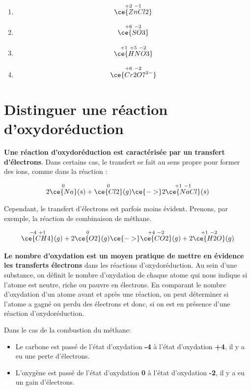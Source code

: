 \documentclass[
  11pt,
  french,
  a4paper,
  openany]{book}
\providecommand{\tightlist}{%
  \setlength{\itemsep}{0pt}\setlength{\parskip}{0pt}}
\begin{document}
\begin{Answer}

\begin{enumerate}
\def\labelenumi{\alph{enumi}.}
\tightlist
\item
  \[
  \overset{+2\ -1}{\ce{ZnCl2}}
  \]
\item
  \[
  \overset{+6\ -2}{\ce{SO3}}
  \]
\item
  \[
  \overset{+1\ +5\ -2}{\ce{HNO3}}
  \]
\item
  \[
  \overset{+6\ -2}{\ce{Cr2O7^{2-}}}
  \]
\end{enumerate}


\end{Answer}

\clearpage

\hypertarget{distinguer-une-ruxe9action-doxydoruxe9duction}{%
\section{Distinguer une réaction d'oxydoréduction}\label{distinguer-une-ruxe9action-doxydoruxe9duction}}

\textbf{Une réaction d'oxydoréduction est caractérisée par un transfert d'électrons}. Dans certains cas, le transfert se fait au sens propre pour former des ions, comme dans la réaction :

\[
2\overset{0}{\ce{Na}}(s) + \overset{0}{\ce{Cl2}}(g) \ce{->} 2\overset{+1\ -1}{\ce{NaCl}}(s)
\]

Cependant, le transfert d'électrons est parfois moins évident. Prenons, par exemple, la réaction de combinaison de méthane.

\[
\overset{-4\ +1}{\ce{CH4}}(g) + 2\overset{0}{\ce{O2}}(g) \ce{->} \overset{+4\ -2}{\ce{CO2}}(g) + 2\overset{+1\ -2}{\ce{H2O}}(g)
\]

\textbf{Le nombre d'oxydation est un moyen pratique de mettre en évidence les transferts électrons} dans les réactions d'oxydoréduction. Au sein d'une substance, on définit le nombre d'oxydation de chaque atome qui nous indique si l'atome est neutre, riche ou pauvre en électrons. En comparant le nombre d'oxydation d'un atome avant et après une réaction, on peut déterminer si l'atome a gagné ou perdu des électrons et donc, si on est en présence d'une réaction d'oxydoréduction.

Dans le cas de la combustion du méthane:

\begin{itemize}
\tightlist
\item
  Le carbone est passé de l'état d'oxydation \textbf{-4} à l'état d'oxydation \textbf{+4}, il y a eu une perte d'électrons.
\item
  L'oxygène est passé de l'état d'oxydation \textbf{0} à l'état d'oxydation \textbf{-2}, il y a eu un gain d'électrons.
\end{itemize}
\end{document}
